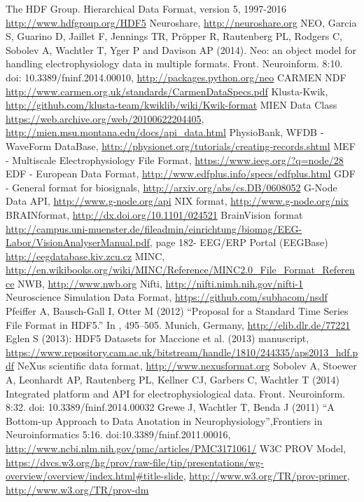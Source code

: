 \documentclass[letterpaper, 10 pt, conference]{ieeeconf}  \IEEEoverridecommandlockouts                              \overrideIEEEmargins
\begin{document}
\medskip
\begin{thebibliography}{99}

 The HDF Group. Hierarchical Data Format, version 5, 1997-2016 \url{http://www.hdfgroup.org/HDF5}
 Neuroshare, \url{http://neuroshare.org}
 NEO, Garcia S, Guarino D, Jaillet F, Jennings TR, Pr{\" o}pper R, Rautenberg PL, Rodgers C, Sobolev A, Wachtler T, Yger P and Davison AP (2014). Neo: an object model for handling electrophysiology data in multiple formats. Front. Neuroinform. 8:10. doi: 10.3389/fninf.2014.00010, \url{http://packages.python.org/neo}
 CARMEN NDF \url{http://www.carmen.org.uk/standards/CarmenDataSpecs.pdf}
 Klusta-Kwik, \url{http://github.com/klusta-team/kwiklib/wiki/Kwik-format}
 MIEN Data Class \url{https://web.archive.org/web/20100622204405}, \url{http://mien.msu.montana.edu/docs/api_data.html}
 PhysioBank, WFDB  - WaveForm DataBase, \url{http://physionet.org/tutorials/creating-records.shtml}
 MEF - Multiscale Electrophysiology File Format, \url{https://www.ieeg.org/?q=node/28}
 EDF - European Data Format, \url{http://www.edfplus.info/specs/edfplus.html}
 GDF - General format for biosignals, \url{http://arxiv.org/abs/cs.DB/0608052}
 G-Node Data API, \url{http://www.g-node.org/api}
 NIX format, \url{http://www.g-node.org/nix}
 BRAINformat, \url{http://dx.doi.org/10.1101/024521}
 BrainVision format \url{http://campus.uni-muenster.de/fileadmin/einrichtung/biomag/EEG-Labor/VisionAnalyserManual.pdf}, page 182-
 EEG/ERP Portal (EEGBase) \url{http://eegdatabase.kiv.zcu.cz}
 MINC, \url{http://en.wikibooks.org/wiki/MINC/Reference/MINC2.0_File_Format_Reference}
 NWB, \url{http://www.nwb.org}
 Nifti, \url{http://nifti.nimh.nih.gov/nifti-1}
 Neuroscience Simulation Data Format, \url{https://github.com/subhacom/nsdf}
 Pfeiffer A, Bausch-Gall I, Otter M (2012) ``Proposal for a Standard Time Series File Format in HDF5.'' In , 495–505. Munich, Germany, \url{http://elib.dlr.de/77221}
 Eglen S (2013): HDF5 Datasets for Maccione et al. (2013) manuscript, \url{https://www.repository.cam.ac.uk/bitstream/handle/1810/244335/aps2013_hdf.pdf}
 NeXus scientific data format, \url{http://www.nexusformat.org}
 Sobolev A, Stoewer A, Leonhardt AP, Rautenberg PL, Kellner CJ, Garbers C, Wachtler T (2014) Integrated platform and API for electrophysiological data. Front. Neuroinform. 8:32. doi: 10.3389/fninf.2014.00032
 Grewe J, Wachtler T, Benda J (2011) ``A Bottom-up Approach to Data Anotation in Neurophysiology'',Frontiers in Neuroinformatics 5:16. doi:10.3389/fninf.2011.00016, \url{http://www.ncbi.nlm.nih.gov/pmc/articles/PMC3171061/}
 W3C PROV Model, \url{https://dvcs.w3.org/hg/prov/raw-file/tip/presentations/wg-overview/overview/index.html#title-slide}, \url{http://www.w3.org/TR/prov-primer}, \url{http://www.w3.org/TR/prov-dm}

\end{thebibliography}
\end{document}
